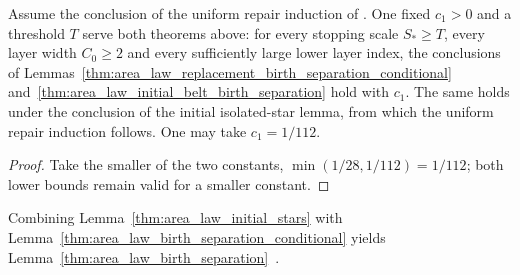 \begin{lemma}
    \label{thm:area_law_birth_separation_conditional}
    \leanok
    Assume the conclusion of the uniform repair induction of
    \cite[Section~11]{OpenAI2026AreaLaw}. One fixed $c_1>0$ and a threshold
    $T$ serve both theorems above: for every stopping scale $S_*\ge T$,
    every layer width $C_0\ge2$ and every sufficiently large lower layer
    index, the
    conclusions of
    Lemmas~\ref{thm:area_law_replacement_birth_separation_conditional}
    and~\ref{thm:area_law_initial_belt_birth_separation} hold with $c_1$.
    The same holds under the conclusion of the initial isolated-star lemma,
    from which the uniform repair induction follows. One may take
    $c_1=1/112$.
\end{lemma}

\begin{proof}
    \leanok
    Take the smaller of the two constants, $\min(1/28,1/112)=1/112$; both
    lower bounds remain valid for a smaller constant.
\end{proof}

Combining Lemma~\ref{thm:area_law_initial_stars} with
Lemma~\ref{thm:area_law_birth_separation_conditional} yields
Lemma~\ref{thm:area_law_birth_separation}~\cite{gap:arealaw2d_birth_separation_scope}.

